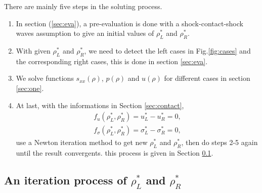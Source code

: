 \documentclass[review]{elsarticle}
\begin{document}
There are mainly five  steps in the soluting process. 
\begin{enumerate}
  \item In section (\ref{sec:eva}), a pre-evaluation is done with a shock-contact-shock waves assumption to give an initial values of $\rho^*_L$ and $\rho^*_R$.  

  \item  With  given $\rho^*_L$ and $\rho^*_R$, we need to  detect the left cases in Fig.\ref{fig:cases} and the corresponding right cases, this is done in section \ref{sec:eva}.

  \item  We solve functions $s_{xx}(\rho)$, $p(\rho)$ and $u(\rho)$ for  different cases in section \ref{sec:one}.

\item At last,   with  the informations in Section \ref{sec:contact},  
\begin{equation}\label{eq:fus}
  \begin{aligned}
	f_u(\rho^*_L,\rho^*_R) = u_L^* -u_R^* = 0,\\
	f_\sigma(\rho^*_L,\rho^*_R) = \sigma_L^* -\sigma_R^* = 0,
\end{aligned}
\end{equation}
 use a Newton iteration method to  get new $\rho^*_L$ and $\rho^*_R$, then do steps 2-5 again until the result convergents. this process is given in Section \ref{sec:iteration}.
\end{enumerate}

  \subsection{An iteration process of $\rho^*_L$ and $\rho^*_R$}\label{sec:iteration}
\end{document}
